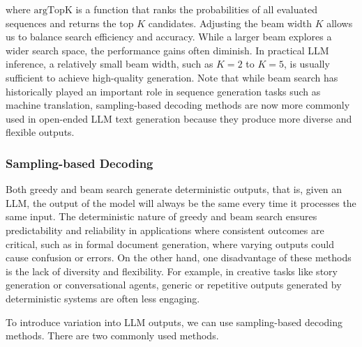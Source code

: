 \noindent where $\mathrm{argTopK}$ is a function that ranks the probabilities of all evaluated sequences and returns the top $K$ candidates. Adjusting the beam width $K$ allows us to balance search efficiency and accuracy. While a larger beam explores a wider search space, the performance gains often diminish. In practical LLM inference, a relatively small beam width, such as $K=2$ to $K=5$, is usually sufficient to achieve high-quality generation. Note that while beam search has historically played an important role in sequence generation tasks such as machine translation, sampling-based decoding methods are now more commonly used in open-ended LLM text generation because they produce more diverse and flexible outputs.

\subsubsection{Sampling-based Decoding}

Both greedy and beam search generate deterministic outputs, that is, given an LLM, the output of the model will always be the same every time it processes the same input. The deterministic nature of greedy and beam search ensures predictability and reliability in applications where consistent outcomes are critical, such as in formal document generation, where varying outputs could cause confusion or errors. On the other hand, one disadvantage of these methods is the lack of diversity and flexibility. For example, in creative tasks like story generation or conversational agents, generic or repetitive outputs generated by deterministic systems are often less engaging.

To introduce variation into LLM outputs, we can use sampling-based decoding methods. There are two commonly used methods.

